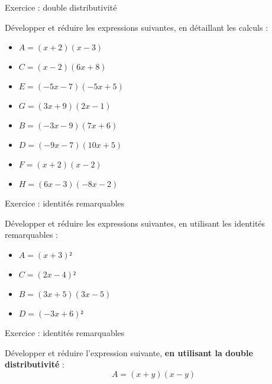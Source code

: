 \documentclass{automatisme}
\begin{document}
\begin{frame}
	\begin{center}
		\LARGE

		Exercice : double distributivité
	\end{center}
	\vspace{2em}

	Développer et réduire les expressions suivantes, en détaillant les calculs :

	\begin{multicols}{2}
		\begin{itemize}
			\item $A = (x + 2)(x - 3)$
			\item $C = (x - 2)(6x + 8)$
			\item $E = (-5x - 7)(-5x + 5)$
			\item $G = (3x + 9)(2x - 1)$
			\item $B = (-3x - 9)(7x + 6)$
			\item $D = (-9x - 7)(10x + 5)$
			\item $F = (x + 2)(x - 2)$
			\item $H = (6x - 3)(-8x - 2)$
		\end{itemize}
	\end{multicols}
\end{frame}

\begin{frame}
	\begin{center}
		\LARGE

		Exercice : identités remarquables
	\end{center}
	Développer et réduire les expressions suivantes, en utilisant les identités remarquables :
	\begin{multicols}{2}
		\begin{itemize}
			\item $A = (x + 3)²$
			\item $C = (2x - 4)²$
			\item $B = (3x + 5)(3x - 5)$
			\item $D = (-3x + 6)²$
		\end{itemize}
	\end{multicols}
\end{frame}

\begin{frame}
	\begin{center}
		\LARGE

		Exercice : identités remarquables
	\end{center}
	Développer et réduire l'expression suivante, \textbf{en utilisant la double distributivité} :
	$$ A = (x + y)(x - y) $$
\end{frame}
\end{document}
